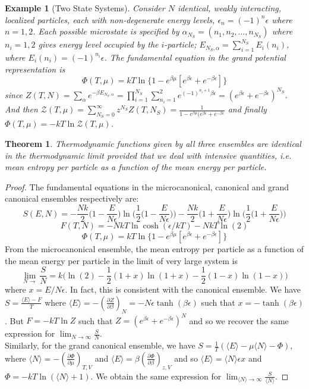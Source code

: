 \documentclass[a4paper]{article}
\newtheorem{eg}{Example}[section]
\newtheorem{thm}{Theorem}[section]
\theoremstyle{new}
\begin{document}
\begin{eg}[Two State Systems]
Consider $N$ identical, weakly interacting, localized particles, each with non-degenerate energy levels, $\epsilon_n=(-1)^n\epsilon$ where $n=1,2$. Each possible microstate is specified by $\alpha_{N_S}=(n_1,n_2,...,n_{N_S})$ where $n_i=1,2$ gives energy level occupied by the $i$-particle; $E_{N_S,\alpha}=\sum_{i=1}^{N_S}E_i(n_i)$, where $E_i(n_i)=(-1)^{n_i}\epsilon$. The fundamental equation in the grand potential representation is
$$\Phi(T,\mu)=kT\ln\{1-e^{\beta\mu}[e^{\beta\epsilon}+e^{-\beta\epsilon}]\}$$
since $Z(T,N)=\sum_\alpha e^{-\beta E_{N_S,\alpha}}=\prod_{i=1}^{N_S}\sum_{n_i=1}^2e^{(-1)^{n_i+1}\beta\epsilon}=(e^{\beta\epsilon}+e^{-\beta\epsilon})^{N_S}$. And then $\mathcal{Z}(T,\mu)=\sum_{N_S=0}^\infty z^{N_S}Z(T,N_S)=\frac{1}{1-e^{\beta\mu}(e^{\beta\epsilon}+e^{-\beta\epsilon}}$ and finally $\Phi(T,\mu)=-kT\ln\mathcal{Z}(T,\mu)$.
\end{eg}
\begin{thm}
Thermodynamic functions given by all three ensembles are identical in the thermodynamic limit provided that we deal with intensive quantities, i.e. mean entropy per particle as a function of the mean energy per particle.
\end{thm}
\begin{proof}
The fundamental equations in the microcanonical, canonical and grand canonical ensembles respectively are:
$$S(E,N)=-\frac{Nk}{2}\bigg(1-\frac{E}{N\epsilon}\bigg)\ln\bigg(\frac{1}{2}\bigg(1-\frac{E}{N\epsilon}\bigg)\bigg)-\frac{Nk}{2}\bigg(1+\frac{E}{N\epsilon}\bigg)\ln\bigg(\frac{1}{2}\bigg(1+\frac{E}{N\epsilon}\bigg)\bigg)$$
$$F(T,N)=-NkT\ln\cosh(\epsilon/kT) -NkT\ln(2)$$
$$\Phi(T,\mu)=kT\ln\{1-e^{\beta\mu}[e^{\beta\epsilon}+e^{-\beta\epsilon}]\}$$
From the microcanonical ensemble, the mean entropy per particle as a function of the mean energy per particle in the limit of very large system is
$$\lim_{N\rightarrow}\frac{S}{N}=k\bigg(\ln(2)-\frac{1}{2}(1+x)\ln(1+x)-\frac{1}{2}(1-x)\ln(1-x)\bigg)$$
where $x=E/N\epsilon$. In fact, this is consistent with the canonical ensemble. We have $S=\frac{\langle E\rangle-F}{T}$ where $\langle E\rangle=-(\frac{\partial Z}{\partial\beta})_N=-N\epsilon\tanh(\beta\epsilon)$ such that $x=-\tanh(\beta\epsilon)$. But $F=-kT\ln Z$ such that $Z=(e^{\beta\epsilon}+e^{-\beta\epsilon})^N$ and so we recover the same expression for $\lim_{N\rightarrow\infty}\frac{S}{N}$.\\[5pt]
Similarly, for the grand canonical ensemble, we have $S=\frac{1}{T}(\langle E\rangle-\mu\langle N\rangle-\Phi)$, where $\langle N\rangle=-(\frac{\partial\Phi}{\partial\mu})_{T,V}$ and $\langle E\rangle=\beta(\frac{\partial\Phi}{\partial\beta})_{z,V}$ and so $\langle E\rangle=\langle N\rangle\epsilon x$ and $\Phi=-kT\ln(\langle N\rangle+1)$. We obtain the same expression for $\lim_{\langle N\rangle\rightarrow\infty}\frac{S}{\langle N\rangle}$.
\end{proof}
\end{document}
